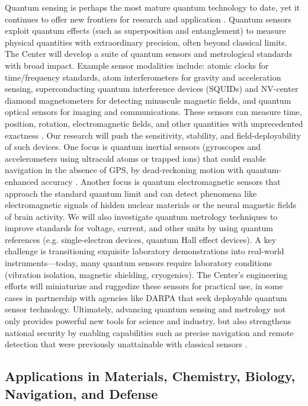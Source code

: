 \documentclass[12pt]{article}
\begin{document}
Quantum sensing is perhaps the most mature quantum technology to date, yet it continues to offer new frontiers for research and application . Quantum sensors exploit quantum effects (such as superposition and entanglement) to measure physical quantities with extraordinary precision, often beyond classical limits. The Center will develop a suite of quantum sensors and metrological standards with broad impact. Example sensor modalities include: atomic clocks for time/frequency standards, atom interferometers for gravity and acceleration sensing, superconducting quantum interference devices (SQUIDs) and NV-center diamond magnetometers for detecting minuscule magnetic fields, and quantum optical sensors for imaging and communications. These sensors can measure time, position, rotation, electromagnetic fields, and other quantities with unprecedented exactness . Our research will push the sensitivity, stability, and field-deployability of such devices. One focus is quantum inertial sensors (gyroscopes and accelerometers using ultracold atoms or trapped ions) that could enable navigation in the absence of GPS, by dead-reckoning motion with quantum-enhanced accuracy . Another focus is quantum electromagnetic sensors that approach the standard quantum limit and can detect phenomena like electromagnetic signals of hidden nuclear materials or the neural magnetic fields of brain activity. We will also investigate quantum metrology techniques to improve standards for voltage, current, and other units by using quantum references (e.g. single-electron devices, quantum Hall effect devices). A key challenge is transitioning exquisite laboratory demonstrations into real-world instruments—today, many quantum sensors require laboratory conditions (vibration isolation, magnetic shielding, cryogenics). The Center’s engineering efforts will miniaturize and ruggedize these sensors for practical use, in some cases in partnership with agencies like DARPA that seek deployable quantum sensor technology. Ultimately, advancing quantum sensing and metrology not only provides powerful new tools for science and industry, but also strengthens national security by enabling capabilities such as precise navigation and remote detection that were previously unattainable with classical sensors .



\subsection{Applications in Materials, Chemistry, Biology, Navigation, and Defense}
\end{document}
